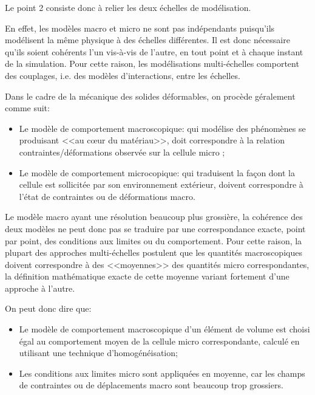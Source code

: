 \medskip
Le point 2 consiste donc à relier les deux échelles de modélisation.

En effet, les modèles macro et micro ne sont pas indépendants puisqu'ils
modélisent la même physique à des échelles différentes.
Il est donc nécessaire qu'ils soient cohérents l'un vis-à-vis de l'autre, en tout point et à 
chaque instant de la simulation. 
Pour cette raison, les modélisations multi-échelles comportent des couplages, i.e. des 
modèles d'interactions, entre les échelles.

Dans le cadre de la mécanique des solides déformables, on procède
géralement comme suit:
\begin{itemize}
   \item Le modèle de comportement macroscopique:
	qui modélise des phénomènes se produisant <<au cœur du matériau>>, 
	doit correspondre à la relation contraintes/déformations observée sur la cellule micro ;

   \item Le modèle de comportement microcopique:
	qui traduisent la façon dont la cellule est sollicitée par son environnement
 	extérieur, doivent correspondre à l'état de contraintes ou de déformations macro.
\end{itemize}

Le modèle macro ayant une résolution beaucoup plus grossière, la cohérence des deux 
modèles ne peut donc pas se traduire par une correspondance exacte, point par point, des 
conditions aux limites ou du comportement. Pour cette raison, la plupart des approches 
multi-échelles postulent que les quantités macroscopiques doivent correspondre à des 
<<moyennes>> des quantités micro correspondantes,  la définition mathématique exacte de 
cette moyenne variant fortement d'une approche à l'autre. 

\medskip
{} On peut donc dire que:
\begin{itemize}
   \item Le modèle de comportement macroscopique d'un élément de volume est choisi 
	égal au comportement moyen de la cellule micro correspondante, calculé en utilisant 
	une technique d'homogénéisation;

   \item Les conditions aux limites micro sont appliquées en moyenne, car les champs de
	contraintes ou de déplacements macro sont beaucoup trop grossiers.
\end{itemize}

